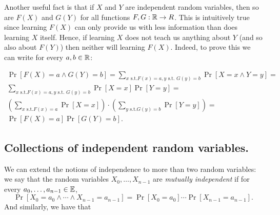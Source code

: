 Another useful fact is that if \(X\) and \(Y\) are independent random
variables, then so are \(F(X)\) and \(G(Y)\) for all functions
\(F,G:{\mathbb{R}} \rightarrow R\). This is intuitively true since learning
\(F(X)\) can only provide us with less information than does learning
\(X\) itself. Hence, if learning \(X\) does not teach us anything about
\(Y\) (and so also about \(F(Y)\)) then neither will learning \(F(X)\).
Indeed, to prove this we can write for every \(a,b \in {\mathbb{R}}\):

\[
\begin{split}
\Pr[ F(X)=a \wedge G(Y)=b ] = \sum_{x \text{ s.t.} F(x)=a, y \text{ s.t. } G(y)=b} \Pr[ X=x \wedge Y=y ] = \\
\sum_{x \text{ s.t.} F(x)=a, y \text{ s.t. } G(y)=b} \Pr[ X=x ] \Pr[  Y=y ]  = \\
\left( \sum_{x \text{ s.t.} F(x)=a } \Pr[X=x ] \right) \cdot \left( \sum_{y \text{ s.t.} G(y)=b } \Pr[Y=y ] \right) = \\
\Pr[ F(X)=a] \Pr[G(Y)=b] .
\end{split}
\]

\subsection{Collections of independent random
variables.}\label{Collections-of-independen}

We can extend the notions of independence to more than two random
variables: we say that the random variables \(X_0,\ldots,X_{n-1}\) are
\emph{mutually independent} if for every \(a_0,\ldots,a_{n-1} \in \operatorname*{\mathbb E}\),
\[
\Pr\left[X_0=a_0 \wedge \cdots \wedge X_{n-1}=a_{n-1}\right]=\Pr[X_0=a_0]\cdots \Pr[X_{n-1}=a_{n-1}] .
\] And similarly, we have that

\hypertarget{expprod}{}

\hypertarget{indeplem}{}

